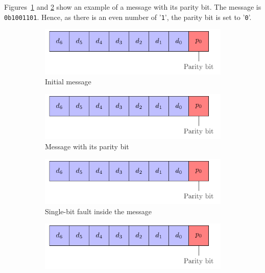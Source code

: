 Figures~\ref{fig:simpleparity_example_1} and \ref{fig:simpleparity_example_2} show an example of a message with its parity bit. The message is \texttt{0b1001101}. Hence, as there is an even number of '\texttt{1}', the parity bit is set to '\texttt{0}'.

\begin{figure}[ht]
    \centering
    \begin{subfigure}[b]{0.49\textwidth}
        \includegraphics[width=\textwidth, page=2]{c5_countermeasures_dift/img/simple_parity.pdf}
        \caption{Initial message}
        \label{fig:simpleparity_example_1}
    \end{subfigure}
    \hfill
    \begin{subfigure}[b]{0.49\textwidth}
        \includegraphics[width=\textwidth, page=3]{c5_countermeasures_dift/img/simple_parity.pdf}
        \caption{Message with its parity bit}
        \label{fig:simpleparity_example_2}
    \end{subfigure}
    \hfill
    \begin{subfigure}[b]{0.49\textwidth}
        \includegraphics[width=\textwidth, page=4]{c5_countermeasures_dift/img/simple_parity.pdf}
        \caption{Single-bit fault inside the message}
        \label{fig:simpleparity_faulted_example_3}
    \end{subfigure}
    \hfill
    \begin{subfigure}[b]{0.49\textwidth}
        \includegraphics[width=\textwidth, page=5]{c5_countermeasures_dift/img/simple_parity.pdf}

\end{subfigure}
\end{figure}
